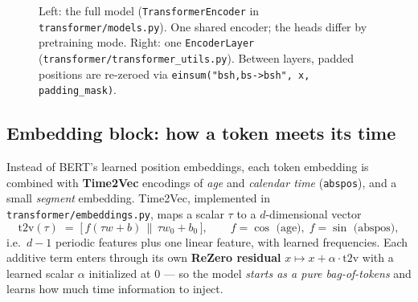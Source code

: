 \documentclass[11pt,a4paper]{article}
\newcommand{\file}[1]{\texttt{\small #1}}
\newcommand{\code}[1]{\texttt{\small #1}}
\begin{document}
\begin{figure}[h!]
\caption{Left: the full model (\code{TransformerEncoder} in
\file{transformer/models.py}). One shared encoder; the heads differ by
pretraining mode. Right: one \code{EncoderLayer}
(\file{transformer/transformer\_utils.py}). Between layers, padded positions are
re-zeroed via \code{einsum("bsh,bs->bsh", x, padding\_mask)}.}
\label{fig:arch}
\end{figure}

\subsection{Embedding block: how a token meets its time}
Instead of BERT's learned position embeddings, each token embedding is combined
with \textbf{Time2Vec} encodings of \emph{age} and \emph{calendar time}
(\code{abspos}), and a small \emph{segment} embedding. Time2Vec, implemented
in \file{transformer/embeddings.py}, maps a scalar $\tau$ to a $d$-dimensional
vector
\[
\mathrm{t2v}(\tau) \;=\; \big[\, f(\tau w + b) \,\|\, \tau w_0 + b_0 \,\big],
\qquad f = \cos \text{ (age)}, \; f = \sin \text{ (abspos)},
\]
i.e.\ $d-1$ periodic features plus one linear feature, with learned frequencies.
Each additive term enters through its own \textbf{ReZero residual}
$x \mapsto x + \alpha \cdot \mathrm{t2v}$ with a learned scalar $\alpha$
initialized at $0$ --- so the model \emph{starts as a pure bag-of-tokens} and
learns how much time information to inject.
\end{document}
